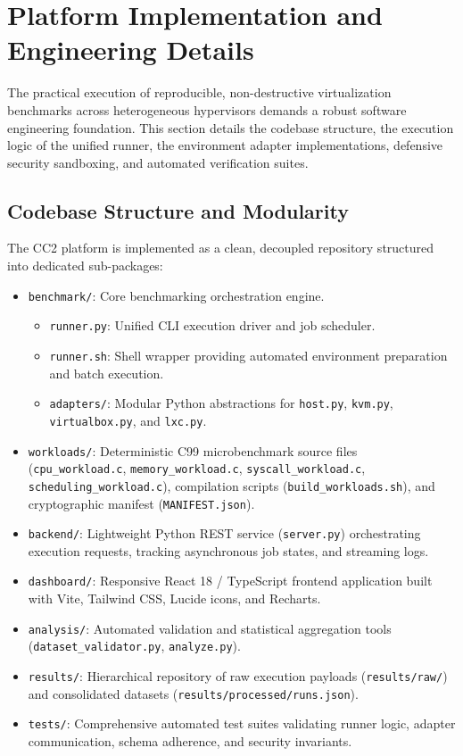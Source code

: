 \section{Platform Implementation and Engineering Details}
\label{sec:implementation}

The practical execution of reproducible, non-destructive virtualization benchmarks across heterogeneous hypervisors demands a robust software engineering foundation. This section details the codebase structure, the execution logic of the unified runner, the environment adapter implementations, defensive security sandboxing, and automated verification suites.

\subsection{Codebase Structure and Modularity}
\label{subsec:codebase_structure}

The CC2 platform is implemented as a clean, decoupled repository structured into dedicated sub-packages:
\begin{itemize}
    \item \texttt{benchmark/}: Core benchmarking orchestration engine.
    \begin{itemize}
        \item \texttt{runner.py}: Unified CLI execution driver and job scheduler.
        \item \texttt{runner.sh}: Shell wrapper providing automated environment preparation and batch execution.
        \item \texttt{adapters/}: Modular Python abstractions for \texttt{host.py}, \texttt{kvm.py}, \texttt{virtualbox.py}, and \texttt{lxc.py}.
    \end{itemize}
    \item \texttt{workloads/}: Deterministic C99 microbenchmark source files (\texttt{cpu\_}\allowbreak\texttt{workload.c}, \texttt{memory\_}\allowbreak\texttt{workload.c}, \texttt{syscall\_}\allowbreak\texttt{workload.c}, \texttt{scheduling\_}\allowbreak\texttt{workload.c}), compilation scripts (\texttt{build\_}\allowbreak\texttt{workloads.sh}), and cryptographic manifest (\texttt{MANIFEST.json}).
    \item \texttt{backend/}: Lightweight Python REST service (\texttt{server.py}) orchestrating execution requests, tracking asynchronous job states, and streaming logs.
    \item \texttt{dashboard/}: Responsive React 18 / TypeScript frontend application built with Vite, Tailwind CSS, Lucide icons, and Recharts.
    \item \texttt{analysis/}: Automated validation and statistical aggregation tools (\texttt{dataset\_validator.py}, \texttt{analyze.py}).
    \item \texttt{results/}: Hierarchical repository of raw execution payloads (\texttt{results/raw/}) and consolidated datasets (\texttt{results/processed/runs.json}).
    \item \texttt{tests/}: Comprehensive automated test suites validating runner logic, adapter communication, schema adherence, and security invariants.
\end{itemize}

